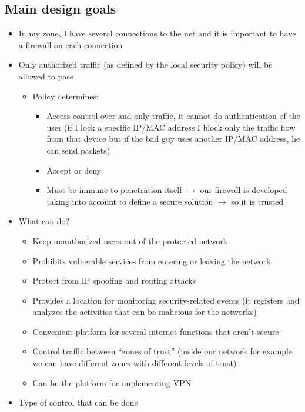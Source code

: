 \documentclass{article}
\begin{document}
\subsection{Main design goals}
\begin{itemize}
  \item In my zone, I have several connections to the net and it is important to have a firewall on each connection
  \item Only authorized traffic (as defined by the local security policy) will be allowed to pass
    \begin{itemize}
      \item Policy determines:
        \begin{itemize}
          \item Access control over and only traffic, it cannot do authentication of the user (if I lock a specific IP/MAC address I block only the traffic flow from that device but if the bad guy uses another IP/MAC address, he can send packets)
          \item Accept or deny
          \item Must be immune to penetration itself $\rightarrow$ our firewall is developed taking into account to define a secure solution $\rightarrow$ so it is trusted
        \end{itemize}
    \end{itemize}
  \item What can do?
    \begin{itemize}
      \item Keep unauthorized users out of the protected network
      \item Prohibits vulnerable services from entering or leaving the network
      \item Protect from IP spoofing and routing attacks
      \item Provides a location for monitoring security-related events (it registers and analyzes the activities that can be malicious for the networks)
      \item Convenient platform for several internet functions that aren’t secure
      \item Control traffic between “zones of trust” (inside our network for example we can have different zones with different levels of trust)
      \item Can be the platform for implementing VPN 
    \end{itemize}
  \item Type of control that can be done

\end{itemize}
\end{document}
